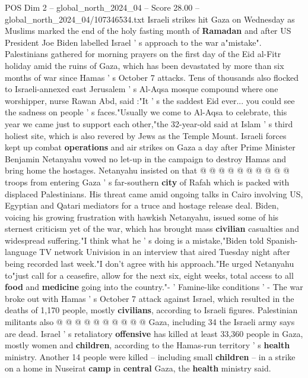 \begin{textsample}{POS Dim 2 – global\_north\_2024\_04 – Score 28.00 – global\_north\_2024\_04/107346534.txt}  \label{ex:f2_pos_263}
Israeli strikes hit Gaza on Wednesday as Muslims marked the end of the holy fasting month of \textbf{Ramadan} and after US President Joe Biden labelled Israel ' s approach to the war a"mistake".
Palestinians gathered for morning prayers on the first day of the Eid al-Fitr holiday amid the ruins of Gaza, which has been devastated by more than six months of war since Hamas ' s October 7 attacks.
Tens of thousands also flocked to Israeli-annexed east Jerusalem ' s Al-Aqsa mosque compound where one worshipper, nurse Rawan Abd, said :"It ' s the saddest Eid ever... you could see the sadness on people ' s faces."Usually we come to Al-Aqsa to celebrate, this year we came just to support each other,"the 32-year-old said at Islam ' s third holiest site, which is also revered by Jews as the Temple Mount.
Israeli forces kept up combat \textbf{operations} and air strikes on Gaza a day after Prime Minister Benjamin Netanyahu vowed no let-up in the campaign to destroy Hamas and bring home the hostages.
Netanyahu insisted on that @ @ @ @ @ @ @ @ @ @ troops from entering Gaza ' s far-southern \textbf{city} of Rafah which is packed with displaced Palestinians.
His threat came amid ongoing talks in Cairo involving US, Egyptian and Qatari mediators for a truce and hostage release deal.
Biden, voicing his growing frustration with hawkish Netanyahu, issued some of his sternest criticism yet of the war, which has brought mass \textbf{civilian} casualties and widespread suffering."I think what he ' s doing is a mistake,"Biden told Spanish-language TV network Univision in an interview that aired Tuesday night after being recorded last week."I don't agree with his approach."He urged Netanyahu to"just call for a ceasefire, allow for the next six, eight weeks, total access to all \textbf{food} and \textbf{medicine} going into the country."- ' Famine-like conditions ' - The war broke out with Hamas ' s October 7 attack against Israel, which resulted in the deaths of 1,170 people, mostly \textbf{civilians}, according to Israeli figures.
Palestinian militants also @ @ @ @ @ @ @ @ @ @ Gaza, including 34 the Israeli army says are dead.
Israel ' s retaliatory \textbf{offensive} has killed at least 33,360 people in Gaza, mostly women and \textbf{children}, according to the Hamas-run territory ' s \textbf{health} ministry.
Another 14 people were killed -- including small \textbf{children} -- in a strike on a home in Nuseirat \textbf{camp} in \textbf{central} Gaza, the \textbf{health} ministry said.

\end{textsample}
